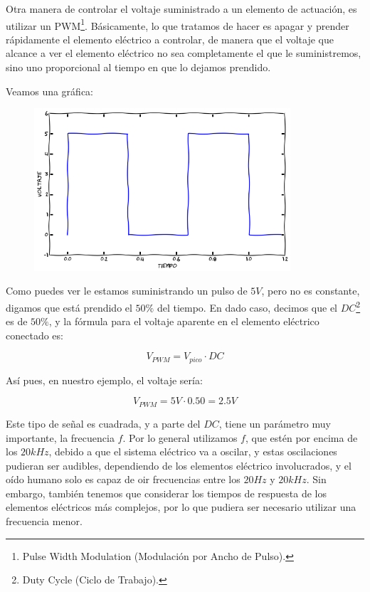 		Otra manera de controlar el voltaje suministrado a un elemento de actuación, es utilizar un PWM\footnote{Pulse Width Modulation (Modulación por Ancho de Pulso).}. Básicamente, lo que tratamos de hacer es apagar y prender rápidamente el elemento eléctrico a controlar, de manera que el voltaje que alcance a ver el elemento eléctrico no sea completamente el que le suministremos, sino uno proporcional al tiempo en que lo dejamos prendido.

		Veamos una gráfica:

		\begin{figure}[h]
			\centering \includegraphics[width=0.85\textwidth]{images/PWM.png}
		\end{figure}

		Como puedes ver le estamos suministrando un pulso de $5 V$, pero no es constante, digamos que está prendido el $50\%$ del tiempo. En dado caso, decimos que el $DC$\footnote{Duty Cycle (Ciclo de Trabajo).} es de $50\%$, y la fórmula para el voltaje aparente en el elemento eléctrico conectado es:

		\begin{equation}
			V_{PWM} = V_{pico} \cdot DC
		\end{equation}

		Así pues, en nuestro ejemplo, el voltaje sería:

		\begin{equation}
			V_{PWM} = 5 V \cdot 0.50 = 2.5 V
		\end{equation}

		Este tipo de señal es cuadrada, y a parte del $DC$, tiene un parámetro muy importante, la frecuencia $f$. Por lo general utilizamos $f$, que estén por encima de los $20 kHz$, debido a que el sistema eléctrico va a oscilar, y estas oscilaciones pudieran ser audibles, dependiendo de los elementos eléctrico involucrados, y el oído humano solo es capaz de oir frecuencias entre los $20 Hz$ y $20 kHz$. Sin embargo, también tenemos que considerar los tiempos de respuesta de los elementos eléctricos más complejos, por lo que pudiera ser necesario utilizar una frecuencia menor.

